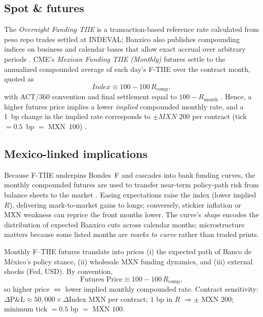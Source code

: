 \documentclass[11pt,a4paper]{article} %
\begin{document}
\subsection{Spot \& futures}
The \emph{Overnight Funding TIIE} is a transaction-based reference rate calculated from peso repo trades settled at INDEVAL; Banxico also publishes compounding indices on business and calendar bases that allow exact accrual over arbitrary periods \citep{banxico_f_tiie_method,banxico_indices_page,banxico_on_method_en}. CME's \emph{Mexican Funding TIIE (Monthly)} futures settle to the annualized compounded average of each day's F-TIIE over the contract month, quoted as
\[
\textit{Index} \equiv 100 - 100\,R_{\text{comp}},
\]
with ACT/360 convention and final settlement equal to \(100 - R_{\text{month}}\) \citep{cme_tiie_monthly_overview,cme_tiie_monthly_specs,cme_tiie_monthly_method,cme_tiie_quarterly_overview}. Hence, a higher futures price implies a lower \emph{implied} compounded monthly rate, and a 1~bp change in the implied rate corresponds to \(\pm \textit{MXN 200}\) per contract (tick \(=0.5\)~bp \(=\) MXN~100) \citep{cme_tiie_monthly_specs}.

\subsection{Mexico-linked implications}
Because F-TIIE underpins Bondes~F and cascades into bank funding curves, the monthly compounded futures are used to transfer near-term policy-path risk from balance sheets to the market \citep{cme_tiie_monthly_overview,cme_ftiie_article}. Easing expectations raise the index (lower implied \(R\)), delivering mark-to-market gains to longs; conversely, stickier inflation or MXN weakness can reprice the front months lower. The curve's \emph{shape} encodes the distribution of expected Banxico cuts across calendar months; microstructure matters because some listed months are \emph{marks to curve} rather than traded prints.


Monthly F--TIIE futures translate into prices (i) the expected path of Banco de México's policy stance, (ii) wholesale MXN funding dynamics, and (iii) external shocks (Fed, USD). By convention,
\[
\text{Futures Price} \equiv 100 - 100\,R_{\text{comp}},
\]
so higher price $\Leftrightarrow$ lower implied monthly compounded rate. Contract sensitivity: $\Delta \mathrm{P\&L} \approx 50{,}000 \times \Delta \text{Index}$ MXN per contract; $1$ bp in $R$ $\Rightarrow \pm$ MXN $200$; minimum tick $=0.5$ bp $=$ MXN $100$.
\end{document}
